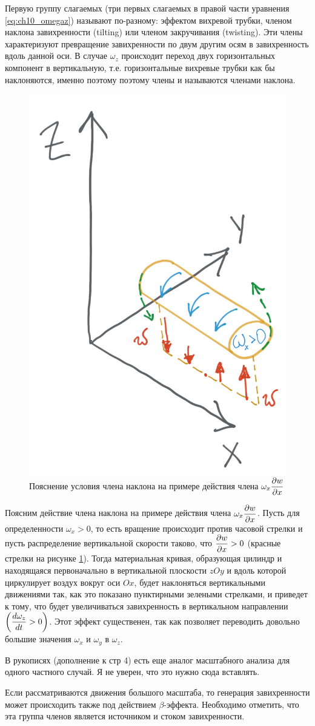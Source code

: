 Первую группу слагаемых (три первых слагаемых в правой части уравнения \ref{eq:ch10_omegaz}) называют по-разному: эффектом вихревой трубки, членом наклона завихренности (tilting) или членом закручивания (twisting). Эти члены характеризуют превращение завихренности по двум другим осям в завихренность вдоль данной оси. В случае $\omega_z$ происходит переход двух горизонтальных компонент в вертикальную, т.е. горизонтальные вихревые трубки как бы наклоняются, именно поэтому поэтому члены и называются членами наклона. 
    \begin{figure}[h]
    \centering
    \includegraphics[width=0.5\linewidth]{pics/ch10.1.png}
    \caption{\label{fig:ch10.1}
    Пояснение условия члена наклона на примере действия члена $\omega_x\displaystyle\frac{\partial w}{\partial x}$
    }
    \end{figure}    
Поясним действие члена наклона на примере действия члена $\omega_x\displaystyle\frac{\partial w}{\partial x}$. Пусть для определенности $\omega_x > 0$, то есть вращение происходит против часовой стрелки и пусть распределение вертикальной скорости таково, что $\displaystyle\frac{\partial w}{\partial x}>0$ (красные стрелки на рисунке \ref{fig:ch10.1}). Тогда материальная кривая, образующая цилиндр и находящаяся первоначально в вертикальной плоскости $zOy$ и вдоль которой циркулирует воздух вокруг оси $Ox$, будет наклоняться вертикальными движениями так, как это показано пунктирными зелеными стрелками, и приведет к тому, что будет увеличиваться завихренность в вертикальном направлении $\left( \displaystyle\frac{d \omega_z}{d t}>0 \right)$. Этот эффект существенен, так как позволяет переводить довольно большие значения $\omega_x$ и $\omega_y$ в $\omega_z$. 
\begin{warn}
    В рукописях (дополнение к стр 4) есть еще аналог масштабного анализа для одного частного случай. Я не уверен, что это нужно сюда вставлять.
\end{warn}
Если рассматриваются движения большого масштаба, то генерация завихренности может происходить также под действием $\beta$-эффекта. Необходимо отметить, что эта группа членов является источником и стоком завихренности.


